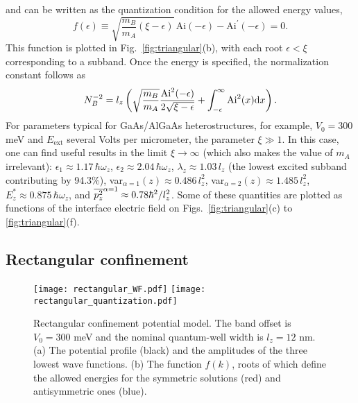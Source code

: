 \documentclass[aps,floatfix,twocolumn,showpacs,10pt,nofootinbib]{revtex4-1}
\newcommand{\be}{\begin{equation}}
\newcommand{\ee}{\end{equation}}
\begin{document}
and can be written as the quantization condition for the allowed energy values,
\be
f(\epsilon) \equiv \sqrt{\frac{m_B}{m_A}(\xi - \epsilon)}\, \textrm{Ai}(-\epsilon) - \textrm{Ai}^\prime(-\epsilon) =0.
\ee
This function is plotted in Fig.~\ref{fig:triangular}(b), with each root $\epsilon<\xi$ corresponding to a subband. Once the energy is specified, the normalization constant follows as
\be
N_B^{-2} = l_z \left( \sqrt{\frac{m_B}{m_A}} \frac{\textrm{Ai}^2(-\epsilon)}{2\sqrt{\xi-\epsilon}} + \int_{-\epsilon}^\infty  \textrm{Ai}^2(x) {\rm d}x \right).
\ee
For parameters typical for GaAs/AlGaAs heterostructures, for example, $V_0=300$ meV and $E_{\textrm{ext}}$ several Volts per micrometer, the parameter $\xi\gg 1$. In this case, one can find useful results in the limit $\xi\to \infty$  (which also makes the value of $m_A$ irrelevant): $\epsilon_1\approx 1.17 \, \hbar \omega_z$, $\epsilon_2\approx 2.04 \, \hbar \omega_z$, $\lambda_z \approx 1.03 \,l_z$ (the lowest excited subband contributing by 94.3\%), var$_{\alpha=1}(z)\approx 0.486 \, l_z^2$, var$_{\alpha=2}(z)\approx 1.485 \, l_z^2$, $E^*_z \approx 0.875 \, \hbar \omega_z$, and $\overline{p_z^2}^{\alpha=1} \approx 0.78 \hbar^2/l_z^2$. Some of these quantities are plotted as functions of the interface electric field on Figs.~\ref{fig:triangular}(c) to \ref{fig:triangular}(f).



\subsection{Rectangular confinement}

\begin{figure}
\texttt{[image: rectangular\_WF.pdf]}
\texttt{[image: rectangular\_quantization.pdf]}
\caption{\label{fig:rectangular}
Rectangular confinement potential model. The band offset is $V_0=300$ meV and the nominal quantum-well width is $l_z=12$ nm. (a) The potential profile (black) and the amplitudes of the three lowest wave functions. (b) The function $f(k)$, roots of which define the allowed energies for the symmetric solutions (red) and antisymmetric ones (blue).
}
\end{figure}
\end{document}
